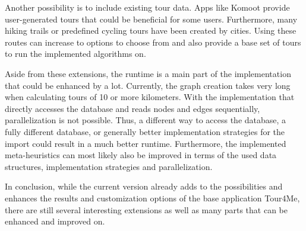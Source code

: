 Another possibility is to include existing tour data. 
Apps like Komoot provide user-generated tours that could be beneficial for some users.
Furthermore, many hiking trails or predefined cycling tours have been created by cities.
Using these routes can increase to options to choose from and also provide a base set of tours to run the implemented algorithms on.


Aside from these extensions, the runtime is a main part of the implementation that could be enhanced by a lot. 
Currently, the graph creation takes very long when calculating tours of 10 or more kilometers.
With the implementation that directly accesses the database and reads nodes and edges sequentially, parallelization is not possible.
Thus, a different way to access the database, a fully different database, or generally better implementation strategies for the import could result in a much better runtime.
Furthermore, the implemented meta-heuristics can most likely also be improved in terms of the used data structures, implementation strategies and parallelization.

In conclusion, while the current version already adds to the possibilities and enhances the results and customization options of the base application Tour4Me, there are still several interesting extensions as well as many parts that can be enhanced and improved on.



